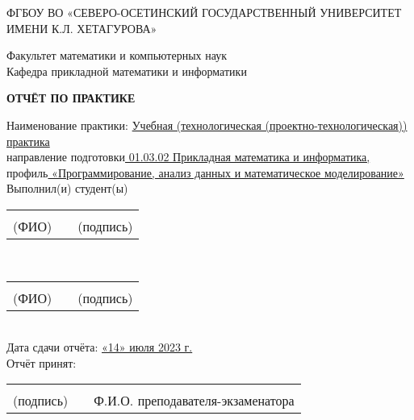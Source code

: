 \documentclass[a4paper,12pt]{article} %
\begin{document}
\setlength{\parindent}{1.25cm} %
\onehalfspacing
\begin{titlepage}
\newpage
\begin{center}
\small{ФГБОУ ВО «СЕВЕРО-ОСЕТИНСКИЙ ГОСУДАРСТВЕННЫЙ УНИВЕРСИТЕТ  \\
     ИМЕНИ К.Л. ХЕТАГУРОВА» \\}
\end{center}
\vspace {1em}
\begin{center}
\small{Факультет математики и компьютерных наук \\
     Кафедра прикладной математики и информатики \\
     }
\end{center}
\vspace{1em}
\begin{center}
\textbf{ОТЧЁТ ПО ПРАКТИКЕ} \\ 
\end{center}
\vspace{1.1em}
\begin{flushleft}
Наименование практики: \underline{Учебная (технологическая (проектно-технологическая))
практика} \\
\vspace{1em}
направление подготовки\underline{ 01.03.02 Прикладная математика и информатика,} \\
профиль\underline{ «Программирование, анализ данных и математическое моделирование»} \\
\vspace{2em}
Выполнил(и) студент(ы) \begin{tabular}{lp{2em}l} 
    \hspace{3cm}   && \hspace{2cm}  \\\cline{1-1}\cline{3-3}          
    (ФИО)     && (подпись)
  \end{tabular} \\
  \begin{tabular}{lp{2em}l} 
    \hspace{3cm}   && \hspace{2cm}  \\\cline{1-1}\cline{3-3}          
    (ФИО)     && (подпись)
  \end{tabular}\\
  \vspace{2em}
  Дата сдачи отчёта: \underline{«14» июля 2023 г.}\\
  \vspace{2em}
  Отчёт принят: \begin{tabular}{lp{2em}l} 
    \hspace{3cm}  && \hspace{2cm}  \\\cline{1-1}\cline{3-3}          
    (подпись)     && Ф.И.О. преподавателя-экзаменатора
  \end{tabular} 
\end{flushleft}
\end{titlepage}
\end{document}
